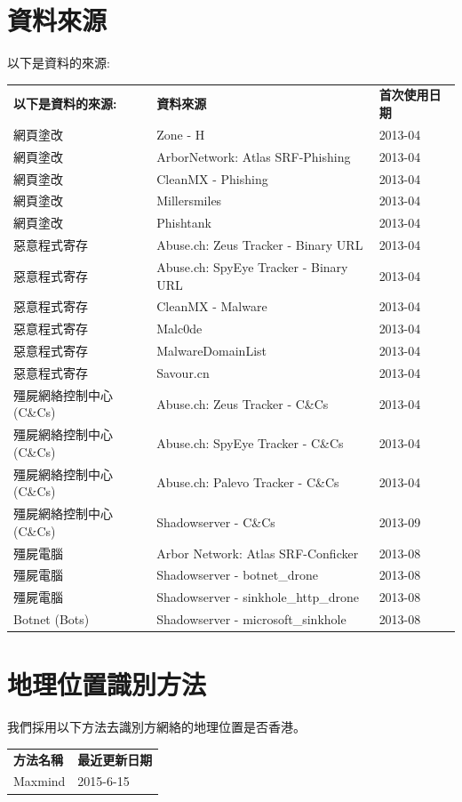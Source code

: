\documentclass[14pt]{extarticle}
\begin{document}
\section{資料來源}
以下是資料的來源:
\begin{table}[!htbp]
\centering
\begin{tabular}{lll}
\hline
{\bf 以下是資料的來源:} & {\bf 資料來源} & \bf 首次使用日期 \\\hhline{===}
網頁塗改 & Zone - H & 2013-04
\\\hline
網頁塗改 & ArborNetwork: Atlas SRF-Phishing & 2013-04
\\\hline
網頁塗改 & CleanMX - Phishing & 2013-04
\\\hline
網頁塗改 & Millersmiles & 2013-04
\\\hline
網頁塗改 & Phishtank & 2013-04
\\\hline
惡意程式寄存 & Abuse.ch: Zeus Tracker - Binary URL & 2013-04
\\\hline
惡意程式寄存 & Abuse.ch: SpyEye Tracker - Binary URL & 2013-04
\\\hline
惡意程式寄存 & CleanMX - Malware & 2013-04
\\\hline
惡意程式寄存 & Malc0de & 2013-04
\\\hline
惡意程式寄存 & MalwareDomainList & 2013-04
\\\hline
惡意程式寄存 & Savour.cn & 2013-04
\\\hline
殭屍網絡控制中心(C\&Cs) & Abuse.ch: Zeus Tracker - C\&Cs & 2013-04
\\\hline
殭屍網絡控制中心(C\&Cs) & Abuse.ch: SpyEye Tracker - C\&Cs & 2013-04
\\\hline
殭屍網絡控制中心(C\&Cs) & Abuse.ch: Palevo Tracker - C\&Cs & 2013-04
\\\hline
殭屍網絡控制中心(C\&Cs) & Shadowserver - C\&Cs & 2013-09
\\\hline
殭屍電腦 & Arbor Network: Atlas SRF-Conficker & 2013-08
\\\hline
殭屍電腦 & Shadowserver - botnet\_drone & 2013-08
\\\hline
殭屍電腦 & Shadowserver - sinkhole\_http\_drone & 2013-08
\\\hline
Botnet (Bots) & Shadowserver - microsoft\_sinkhole & 2013-08
\\\hline
\end{tabular}
\end{table}

\FloatBarrier

\section{地理位置識別方法}
我們採用以下方法去識別方網絡的地理位置是否香港。
\begin{table}[!htbp]
\centering
\begin{tabular}{ll}
\hline
{\bf 方法名稱} & {\bf 最近更新日期} \\\hhline{==}

Maxmind & 2015-6-15
\\\hline
\end{tabular}
\end{table}
\newpage
\end{document}
